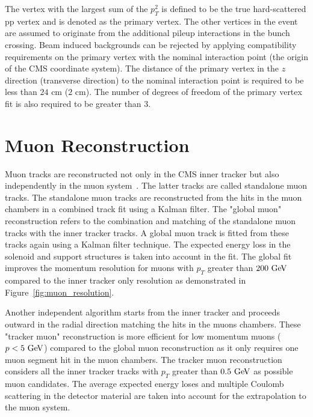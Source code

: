 The vertex with the largest sum of the $p_{T}^2$ is defined to be the true hard-scattered pp vertex and is denoted as the primary vertex. The other vertices in the event are assumed to originate from the additional pileup interactions in the bunch crossing. Beam induced backgrounds can be rejected by applying compatibility requirements on the primary vertex with the nominal interaction point (the origin of the CMS coordinate system). The distance of the primary vertex in the $z$ direction (transverse direction) to the nominal interaction point is required to be less than $24$ cm ($2$ cm). The number of degrees of freedom of the primary vertex fit is also required to be greater than $3$.

\section{Muon Reconstruction}

Muon tracks are reconstructed not only in the CMS inner tracker but also independently in the muon system~\cite{Chatrchyan:2012xi}. The latter tracks are called standalone muon tracks. The standalone muon tracks are reconstructed from the hits in the muon chambers in a combined track fit using a Kalman filter. The "global muon" reconstruction refers to the combination and matching of the standalone muon tracks with the inner tracker tracks. A global muon track is fitted from these tracks again using a Kalman filter technique. The expected energy loss in the solenoid and support structures is taken into account in the fit. The global fit improves the momentum resolution for muons with $p_{T}$ greater than $200~\mathrm{Ge\kern -0.1em V}$ compared to the inner tracker only resolution as demonstrated in Figure~\ref{fig:muon_resolution}.   

Another independent algorithm starts from the inner tracker and proceeds outward in the radial direction matching the hits in the muons chambers. These "tracker muon" reconstruction is more efficient for low momentum muons ($p < 5~\mathrm{Ge\kern -0.1em V}$) compared to the global muon reconstruction as it only requires one muon segment hit in the muon chambers. The tracker muon reconstruction considers all the inner tracker tracks with $p_{T}$ greater than $0.5~\mathrm{Ge\kern -0.1em V}$ as possible muon candidates. The average expected energy loses and multiple Coulomb scattering in the detector material are taken into account for the extrapolation to the muon system. 

